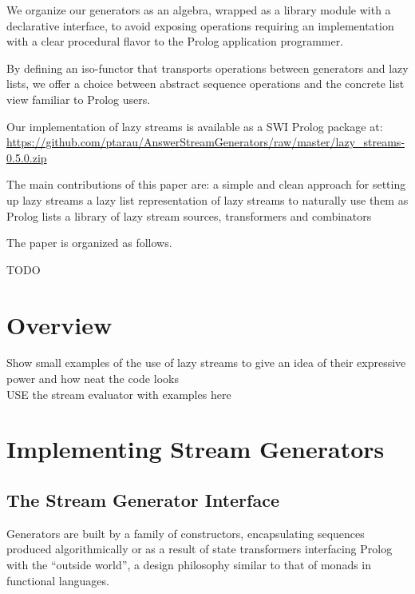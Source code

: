 \documentclass{new_tlp}
\begin{document}
We organize our generators as an algebra, wrapped as a library module with a declarative interface, to avoid exposing  operations requiring an implementation with a clear procedural flavor to the Prolog application programmer.

By defining an iso-functor that transports operations between
generators and lazy lists, we offer a choice between 
abstract sequence operations and the concrete list view familiar to Prolog users.

Our implementation of lazy streams is available as a SWI Prolog package at:\\
{\small \url{https://github.com/ptarau/AnswerStreamGenerators/raw/master/lazy_streams-0.5.0.zip } }

The main contributions of this paper are:
\BI
\I a simple and clean approach for setting up lazy streams
\I a lazy list representation of lazy streams to naturally use them as Prolog lists
\I a library of lazy stream sources, transformers and combinators %
\EI

The paper is organized as follows.

{\Large TODO}

\section{Overview}

{\Large
     Show small examples of the use of lazy streams to give an idea of their expressive power and how neat the code looks\\
     
     USE the stream evaluator with examples here
 }
     
     

\section{Implementing Stream Generators}
     
\subsection{The Stream Generator Interface}

Generators are built by a family of constructors, encapsulating sequences produced algorithmically or as a result of state transformers interfacing Prolog with the ``outside world'', a design philosophy similar to that of monads in functional languages.
\end{document}
